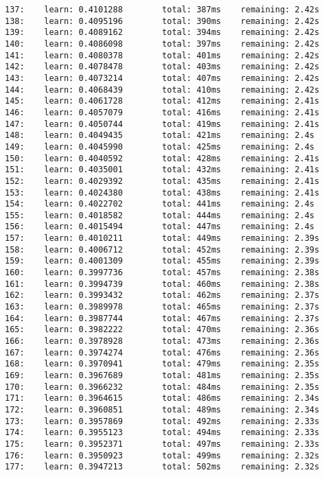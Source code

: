 \documentclass[11pt]{article}
\begin{document}
\begin{Verbatim}[commandchars=\\\{\}]
137:    learn: 0.4101288        total: 387ms    remaining: 2.42s
138:    learn: 0.4095196        total: 390ms    remaining: 2.42s
139:    learn: 0.4089162        total: 394ms    remaining: 2.42s
140:    learn: 0.4086098        total: 397ms    remaining: 2.42s
141:    learn: 0.4080378        total: 401ms    remaining: 2.42s
142:    learn: 0.4078478        total: 403ms    remaining: 2.42s
143:    learn: 0.4073214        total: 407ms    remaining: 2.42s
144:    learn: 0.4068439        total: 410ms    remaining: 2.42s
145:    learn: 0.4061728        total: 412ms    remaining: 2.41s
146:    learn: 0.4057079        total: 416ms    remaining: 2.41s
147:    learn: 0.4050744        total: 419ms    remaining: 2.41s
148:    learn: 0.4049435        total: 421ms    remaining: 2.4s
149:    learn: 0.4045990        total: 425ms    remaining: 2.4s
150:    learn: 0.4040592        total: 428ms    remaining: 2.41s
151:    learn: 0.4035001        total: 432ms    remaining: 2.41s
152:    learn: 0.4029392        total: 435ms    remaining: 2.41s
153:    learn: 0.4024380        total: 438ms    remaining: 2.41s
154:    learn: 0.4022702        total: 441ms    remaining: 2.4s
155:    learn: 0.4018582        total: 444ms    remaining: 2.4s
156:    learn: 0.4015494        total: 447ms    remaining: 2.4s
157:    learn: 0.4010211        total: 449ms    remaining: 2.39s
158:    learn: 0.4006712        total: 452ms    remaining: 2.39s
159:    learn: 0.4001309        total: 455ms    remaining: 2.39s
160:    learn: 0.3997736        total: 457ms    remaining: 2.38s
161:    learn: 0.3994739        total: 460ms    remaining: 2.38s
162:    learn: 0.3993432        total: 462ms    remaining: 2.37s
163:    learn: 0.3989978        total: 465ms    remaining: 2.37s
164:    learn: 0.3987744        total: 467ms    remaining: 2.37s
165:    learn: 0.3982222        total: 470ms    remaining: 2.36s
166:    learn: 0.3978928        total: 473ms    remaining: 2.36s
167:    learn: 0.3974274        total: 476ms    remaining: 2.36s
168:    learn: 0.3970941        total: 479ms    remaining: 2.35s
169:    learn: 0.3967689        total: 481ms    remaining: 2.35s
170:    learn: 0.3966232        total: 484ms    remaining: 2.35s
171:    learn: 0.3964615        total: 486ms    remaining: 2.34s
172:    learn: 0.3960851        total: 489ms    remaining: 2.34s
173:    learn: 0.3957869        total: 492ms    remaining: 2.33s
174:    learn: 0.3955123        total: 494ms    remaining: 2.33s
175:    learn: 0.3952371        total: 497ms    remaining: 2.33s
176:    learn: 0.3950923        total: 499ms    remaining: 2.32s
177:    learn: 0.3947213        total: 502ms    remaining: 2.32s

\end{Verbatim}
\end{document}
